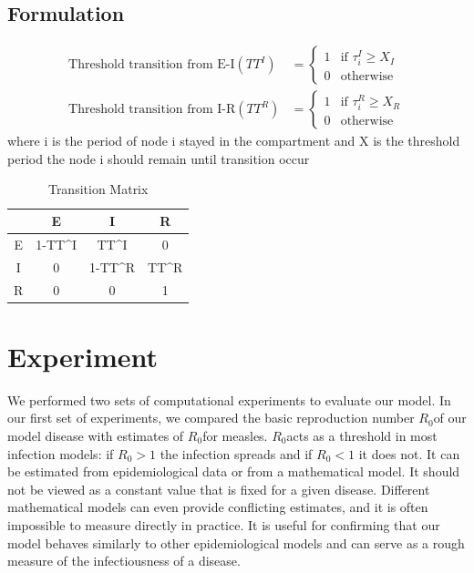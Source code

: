 \documentclass[conference]{IEEEtran}
\newcommand{\ro}{$R_0$}
\begin{document}
\subsection{Formulation}
\begin{align*}
    \text{Threshold transition from E-I}(TT^{I}) &=%
    \begin{cases}
    1 &\text{if } \tau_{i}^{I} \geq X_{I}\\
    0 &\text{otherwise}
    \end{cases}\\
    \text{Threshold transition from I-R}(TT^{R}) &=%
    \begin{cases}
    1 &\text{if } \tau_{i}^{R} \geq X_{R}\\
    0 &\text{otherwise}
    \end{cases}
\end{align*}
where i is the period of node i stayed in the compartment and X is the threshold period the node i should remain until transition occur
\begin{table}[t]
    \centering
   \begin{tabular}{|C | C | C | C |}
        \hline
        \hphantom{ } & E & I & R\\
        \hline
        E &  1-TT^{I} & TT^{I} & 0\\
        \hline
        I &  0 & 1-TT^{R} & TT^{R}\\
        \hline
        R &  0 & 0 & 1\\
        \hline
   \end{tabular}
    \caption{Transition Matrix}
    \label{tab:trans_matrix}
\end{table}

\section{Experiment} %
We performed two sets of computational experiments to evaluate our model. In our first set of experiments, we compared the basic reproduction number \ro of our model disease with estimates of \ro for measles. \ro acts as a threshold in most infection models: if $R_0 > 1$ the infection spreads and if $R_0 < 1$ it does not. It can be estimated from epidemiological data or from a mathematical model. It should not be viewed as a constant value that is fixed for a given disease. Different mathematical models can even provide conflicting estimates, and it is often impossible to measure directly in practice.\cite{Li2011TheFO} It is useful for confirming that our model behaves similarly to other epidemiological models and can serve as a rough measure of the infectiousness of a disease.
\end{document}
